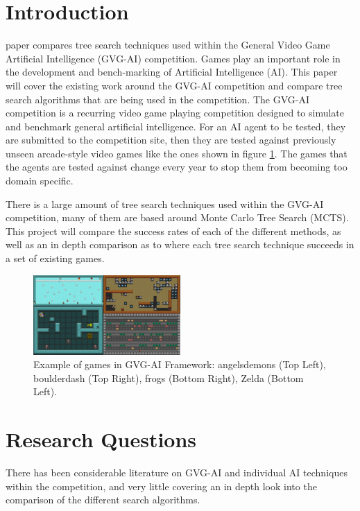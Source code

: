\documentclass[journal]{IEEEtran}
\begin{document}
\section{Introduction}
	 paper compares tree search techniques used within the General Video Game Artificial Intelligence (GVG-AI) competition.  
	Games play an important role in the development and bench-marking of Artificial Intelligence (AI). This paper will cover the existing work around the GVG-AI competition and compare tree search algorithms that are being used in the competition.
	The GVG-AI competition is a recurring video game playing competition designed to simulate and benchmark general artificial intelligence. For an AI agent to be tested, they are submitted to the competition site, then they are tested against previously unseen arcade-style video games like the ones shown in figure \ref{fig:VGDL}. The games that the agents are tested against change every year to stop them from becoming too domain specific.

	There is a large amount of tree search techniques used within the GVG-AI competition, many of them are based around Monte Carlo Tree Search (MCTS). This project will compare the success rates of each of the different methods, as well as an in depth comparison as to where each tree search technique succeeds in a set of existing games.


\begin{figure}[h]
		    \centering
		    \includegraphics[width=0.5\textwidth]{VGDL2}
		    \caption{Example of games in GVG-AI Framework: angelsdemons (Top Left), boulderdash (Top Right), frogs (Bottom Right), Zelda (Bottom Left). }
		    \label{fig:VGDL}
		\end{figure}
		
\section{Research Questions}

	There has been considerable literature on GVG-AI and individual AI techniques within the competition, and very little covering an in depth look into the comparison of the different search algorithms.
\end{document}
